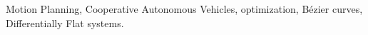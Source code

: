 \noindent Motion Planning, Cooperative Autonomous Vehicles, optimization, Bézier curves, Differentially Flat systems.
